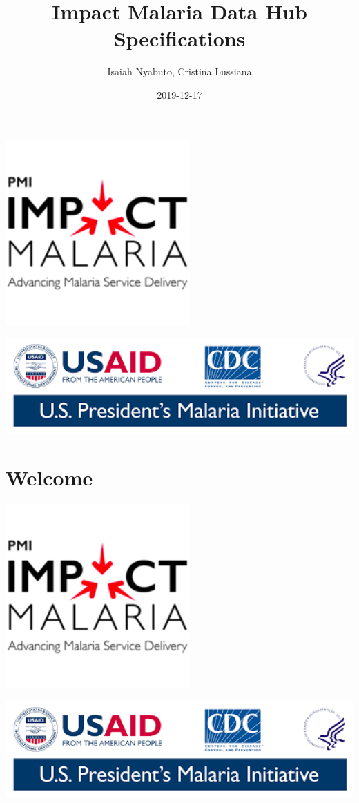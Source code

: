 \documentclass[]{book}
\title{Impact Malaria Data Hub Specifications}
\author{Isaiah Nyabuto, Cristina Lussiana}
\date{2019-12-17}
\begin{document}
\maketitle

{
\setcounter{tocdepth}{1}
\tableofcontents
}
\includegraphics[width=2.78in]{./images/logo1}

\includegraphics[width=5.93in]{./images/logo2}

\hypertarget{welcome}{%
\chapter*{Welcome}\label{welcome}}

\includegraphics[width=2.78in]{./images/logo1}

\includegraphics[width=5.93in]{./images/logo2}
\end{document}
